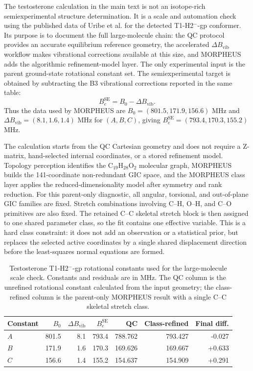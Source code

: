 \documentclass[12pt]{article}
\begin{document}
The testosterone calculation in the main text is not an isotope-rich
semiexperimental structure determination. It is a scale and automation check
using the published data of Uribe et al. for the detected T1-H2$^{-}$-gp
conformer. Its purpose is to document the full large-molecule chain: the
QC protocol provides an accurate equilibrium reference geometry, the
accelerated $\Delta B_\mathrm{vib}$ workflow makes vibrational corrections
	available at this size, and MORPHEUS adds the algorithmic refinement-model layer.
The only experimental input is the parent ground-state rotational constant
set. The semiexperimental target is obtained by subtracting the B3 vibrational
corrections reported in the same table:
\[
B_e^\mathrm{SE}=B_0-\Delta B_\mathrm{vib}.
\]
Thus the data used by MORPHEUS are $B_0=(801.5,171.9,156.6)$ MHz and
$\Delta B_\mathrm{vib}=(8.1,1.6,1.4)$ MHz for $(A,B,C)$, giving
$B_e^\mathrm{SE}=(793.4,170.3,155.2)$ MHz.

The calculation starts from the QC Cartesian geometry and does not require
a Z-matrix, hand-selected internal coordinates, or a stored refinement model.
Topology perception identifies the C$_{19}$H$_{28}$O$_2$ molecular graph,
MORPHEUS builds the 141-coordinate non-redundant GIC space, and the
MORPHEUS class layer applies the reduced-dimensionality model after symmetry
and rank reduction. For this parent-only diagnostic, all angular, torsional,
and out-of-plane GIC families are fixed. Stretch combinations involving C--H,
O--H, and C--O primitives are also fixed. The retained C--C skeletal stretch
block is then assigned to one shared parameter class, so the fit contains one
effective variable. This is a hard class constraint: it does not add an
observation or a statistical prior, but replaces the selected active
coordinates by a single shared displacement direction before the least-squares
normal equations are formed.

\begin{table}
\caption{Testosterone T1-H2$^{-}$-gp rotational constants used for the
large-molecule scale check. Constants and residuals are in MHz. The QC
column is the unrefined rotational constant calculated from the input
geometry; the class-refined column is the parent-only MORPHEUS result with a
single C--C skeletal stretch class.}
\label{tab:si-testosterone-rotconstants}
\begin{tabular}{lrrrrrr}
\toprule
Constant & $B_0$ & $\Delta B_\mathrm{vib}$ & $B_e^\mathrm{SE}$ & QC & Class-refined & Final diff. \\
\midrule
$A$ & 801.5 & 8.1 & 793.4 & 788.762 & 793.427 & -0.027 \\
$B$ & 171.9 & 1.6 & 170.3 & 169.626 & 169.667 & +0.633 \\
$C$ & 156.6 & 1.4 & 155.2 & 154.637 & 154.909 & +0.291 \\
\bottomrule
\end{tabular}
\end{table}
\end{document}
